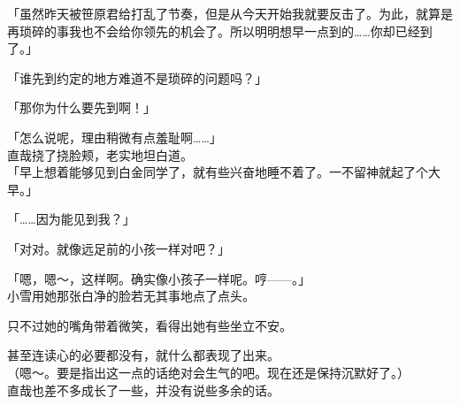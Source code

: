 「虽然昨天被笹原君给打乱了节奏，但是从今天开始我就要反击了。为此，就算是再琐碎的事我也不会给你领先的机会了。所以明明想早一点到的……你却已经到了。」

「谁先到约定的地方难道不是琐碎的问题吗？」

「那你为什么要先到啊！」

「怎么说呢，理由稍微有点羞耻啊……」\\

直哉挠了挠脸颊，老实地坦白道。\\

「早上想着能够见到白金同学了，就有些兴奋地睡不着了。一不留神就起了个大早。」

「……因为能见到我？」

「对对。就像远足前的小孩一样对吧？」

「嗯，嗯～，这样啊。确实像小孩子一样呢。哼——。」\\

小雪用她那张白净的脸若无其事地点了点头。

只不过她的嘴角带着微笑，看得出她有些坐立不安。

甚至连读心的必要都没有，就什么都表现了出来。\\

（嗯～。要是指出这一点的话绝对会生气的吧。现在还是保持沉默好了。）\\

直哉也差不多成长了一些，并没有说些多余的话。

